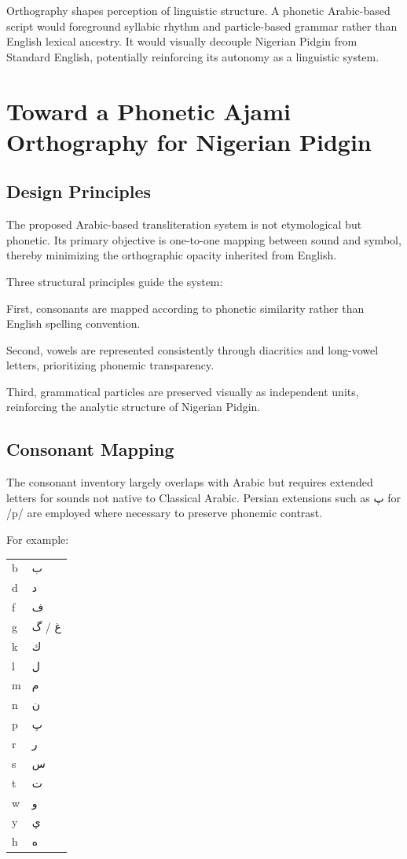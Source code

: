 \documentclass[12pt]{article}
\newcommand{\AR}[1]{\foreignlanguage{arabic}{#1}}
\begin{document}
Orthography shapes perception of linguistic structure. A phonetic Arabic-based script would foreground syllabic rhythm and particle-based grammar rather than English lexical ancestry. It would visually decouple Nigerian Pidgin from Standard English, potentially reinforcing its autonomy as a linguistic system.

\section{Toward a Phonetic Ajami Orthography for Nigerian Pidgin}

\subsection{Design Principles}

The proposed Arabic-based transliteration system is not etymological but phonetic. Its primary objective is one-to-one mapping between sound and symbol, thereby minimizing the orthographic opacity inherited from English.

Three structural principles guide the system:

First, consonants are mapped according to phonetic similarity rather than English spelling convention.

Second, vowels are represented consistently through diacritics and long-vowel letters, prioritizing phonemic transparency.

Third, grammatical particles are preserved visually as independent units, reinforcing the analytic structure of Nigerian Pidgin.

\subsection{Consonant Mapping}

The consonant inventory largely overlaps with Arabic but requires extended letters for sounds not native to Classical Arabic. Persian extensions such as \AR{پ} for /p/ are employed where necessary to preserve phonemic contrast.

For example:

\begin{center}
\begin{tabular}{ll}
b & \AR{ب} \\
d & \AR{د} \\
f & \AR{ف} \\
g & \AR{غ} / \AR{گ} \\
k & \AR{ك} \\
l & \AR{ل} \\
m & \AR{م} \\
n & \AR{ن} \\
p & \AR{پ} \\
r & \AR{ر} \\
s & \AR{س} \\
t & \AR{ت} \\
w & \AR{و} \\
y & \AR{ي} \\
h & \AR{ه} \\
\end{tabular}
\end{center}
\end{document}
